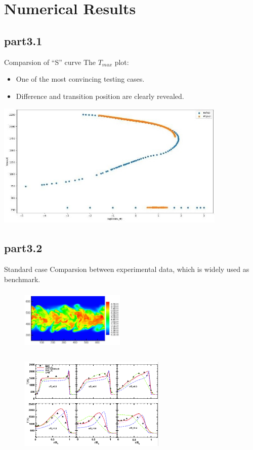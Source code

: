 \section{Numerical Results}
	\subsection{part3.1}
		\begin{xframe}{Comparsion of ``S'' curve}
			The $T_{max}$ plot:
			\begin{itemize}
				\item
					One of the most convincing testing cases.
				\item
					Difference and transition position are clearly revealed\cite{RN11}.
			\end{itemize}			
			\includegraphics[width=11cm, height=6cm]{../pic/Tmax.jpg}	
		\end{xframe}
	\subsection{part3.2}
		\begin{xframe}{Standard case}
			Comparsion between experimental data, which is widely used as benchmark\cite{RN14}.
			\begin{figure}
				\begin{minipage}{3.5cm}
					\centering
					\includegraphics[height=3cm, width=5cm]{../pic/slice.png}
				\end{minipage}%
				\begin{minipage}{7.5cm}
					\centering
					\includegraphics[height=5.5cm, width=7cm]{../pic/line.png}
				\end{minipage}%
			\end{figure}
		\end{xframe}
